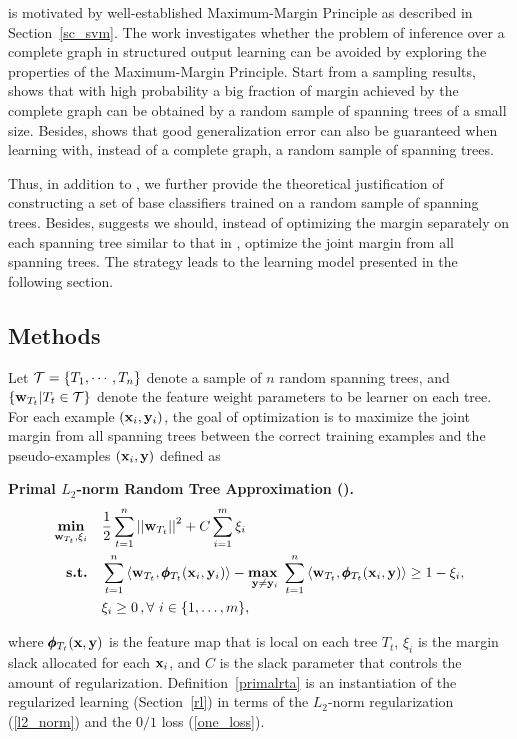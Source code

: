 { is motivated by well-established Maximum-Margin Principle as described in Section~\ref{sc_svm}.
The work investigates whether the problem of inference over a complete graph in structured output learning can be avoided by exploring the properties of the Maximum-Margin Principle.
Start from a sampling results,  shows that with high probability a big fraction of margin achieved by the complete graph can be obtained by a random sample of spanning trees of a small size.
Besides,  shows that good generalization error can also be guaranteed when learning with, instead of a complete graph, a random sample of spanning trees.

Thus, in addition to , we further provide the theoretical justification of constructing a set of base classifiers trained on a random sample of spanning trees. 
Besides,  suggests we should, instead of optimizing the margin separately on each spanning tree similar to that in \mam, optimize the joint margin from all spanning trees.
The strategy leads to the learning model presented in the following section.

\subsection{Methods}

Let $\mathcal{T}=\{T_1,\cdots,T_n\}$ denote a sample of $n$ random spanning trees, and $\{\mathbf {w}_{T_t}|T_t\in\mathcal{T}\}$ denote the feature weight parameters to be learner on each tree.
For each example $(\mathbf {x}_i,\mathbf {y}_i)$, the goal of optimization is to maximize the joint margin from all spanning trees between the correct training examples and the pseudo-examples $(\mathbf {x}_i,\mathbf {y})$ defined as
\begin{definition}{\bf Primal $L_2$-norm Random Tree Approximation (\rta).}\label{primalrta}
	\begin{align*}
		\underset{\vw_{T_t},\xi_i}{\minimize} & \quad \frac{1}{2}\sum_{t=1}^{n}\norm{\vw_{T_t}}^2 + C\sum_{i=1}^{m}\xi_i\\
		\st & \quad \sum_{t=1}^{n}{ \langle \vw_{T_t}, \phib_{T_t}(\vx_i,\vy_i) \rangle} - \underset{\vy \neq \vy_i}{\maximize\ } \sum_{t=1}^{n}{\langle \vw_{T_t}, \phib_{T_t}(\vx_i,\vy) \rangle } \geq 1 -  \xi_i, \\
		& \quad \xi_i\ge0\, , \forall\ i \in \set{1,\dots,m},
	\end{align*}
\end{definition}
\noindent
where $\pmb \phi_{T_t}(\mathbf {x},\mathbf {y})$ is the feature map that is local on each tree $T_t$, $\xi_i$ is the margin slack allocated for each $\mathbf {x}_i$, and $C$ is the slack parameter that controls the amount of regularization.
Definition~\ref{primalrta} is an instantiation of the regularized learning (Section~\ref{rl}) in terms of the $L_2$-norm regularization (\ref{l2_norm}) and the $0/1$ loss (\ref{one_loss}).

}
